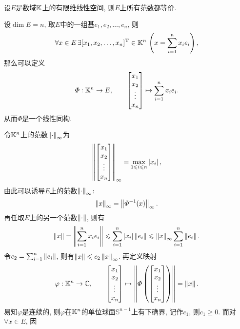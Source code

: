 \begin{Theorem}
	设$ E $是数域$ \mathbb{K} $上的有限维线性空间, 则$ E $上所有范数都等价.
\end{Theorem}
\begin{Proof}
	设$ \dim E=n $, 取$ E $中的一组基$ e_1,e_2, \dots,e_n $, 则
	\[
		\forall x\in E\,\exists[x_1,x_2, \dots,x_n]^\mathrm{T}\in\mathbb{K}^n\,\left( x=\sum_{i=1}^nx_ie_i \right),
	\]
	那么可以定义
	\[
		\varPhi : \mathbb{K}^n\to E,\qquad \begin{bmatrix}
			x_1 \\x_2\\\vdots\\x_n
		\end{bmatrix}\mapsto\sum_{i=1}^nx_ie_i.
	\]
	从而$ \varPhi $是一个线性同构.

	令$ \mathbb{K}^n $上的范数$ \left\| \cdot \right\|_\infty $为
	\[
		\left\| \begin{bmatrix}x_1\\x_2\\\vdots\\x_n\end{bmatrix} \right\|_\infty=\max_{1\leqslant i\leqslant n}\left| x_i \right| ,
	\]
	由此可以诱导$ E $上的范数$ \left\| \cdot \right\|_\infty $:
	\[
		\left\| x \right\|_\infty=\left\| \varPhi^{-1}(x) \right\|_\infty.
	\]
	再任取$ E $上的另一个范数$ \left\| \cdot \right\| $, 则有
	\[
		\left\| x \right\|=\left\| \sum_{i=1}^nx_ie_i \right\|\leqslant\sum_{i=1}^n\left| x_i \right| \left\| e_i \right\|\leqslant\left\| x \right\|_\infty\sum_{i=1}^n\left\| e_i \right\|.
	\]
	令$ c_2=\sum_{i=1}^n\left\| e_i \right\| $, 则有$ \left\| x \right\|\leqslant c_2\left\| x \right\|_\infty $. 再定义映射
	\[
		\varphi : \mathbb{K}^n\to\mathbb{C},\qquad\begin{bmatrix}x_1\\x_2\\\vdots\\x_n\end{bmatrix}\mapsto\left\| \varPhi\left(\begin{bmatrix}
				x_1 \\x_2\\\vdots\\x_n
			\end{bmatrix}\right) \right\|=\left\| x \right\|.
	\]
	易知$ \varphi $是连续的, 则$ \varphi $在$ \mathbb{K}^n $的单位球面$ \mathbb{S}^{n-1} $上有下确界, 记作$ c_1 $, 则$ c_1\geqslant 0 $. 而对$ \forall x\in E $, 因
	\[
\]
\end{Proof}
